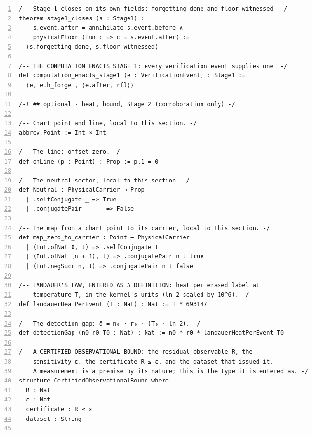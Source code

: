 \documentclass[10pt]{article}
\newcommand{\leansize}{\fontsize{5.5pt}{6.75pt}\selectfont}
\begin{document}
\begin{multicols}{2}
\begin{Verbatim}[numbers=left,firstnumber=1,numbersep=3pt,xleftmargin=2.6em,breaklines=true,breakanywhere=true,breakautoindent=false,breakindent=1.4em,breaksymbolleft={},breakanywheresymbolpre={},fontsize=\leansize]
/-- Stage 1 closes on its own fields: forgetting done and floor witnessed. -/
theorem stage1_closes (s : Stage1) :
    s.event.after = annihilate s.event.before ∧
    physicalFloor (fun c => c = s.event.after) :=
  ⟨s.forgetting_done, s.floor_witnessed⟩

/-- THE COMPUTATION ENACTS STAGE 1: every verification event supplies one. -/
def computation_enacts_stage1 (e : VerificationEvent) : Stage1 :=
  ⟨e, e.h_forget, ⟨e.after, rfl⟩⟩

/-! ## optional · heat, bound, Stage 2 (corroboration only) -/

/-- Chart point and line, local to this section. -/
abbrev Point := Int × Int

/-- The line: offset zero. -/
def onLine (p : Point) : Prop := p.1 = 0

/-- The neutral sector, local to this section. -/
def Neutral : PhysicalCarrier → Prop
  | .selfConjugate _ => True
  | .conjugatePair _ _ _ => False

/-- The map from a chart point to its carrier, local to this section. -/
def map_zero_to_carrier : Point → PhysicalCarrier
  | (Int.ofNat 0, t) => .selfConjugate t
  | (Int.ofNat (n + 1), t) => .conjugatePair n t true
  | (Int.negSucc n, t) => .conjugatePair n t false

/-- LANDAUER'S LAW, ENTERED AS A DEFINITION: heat per erased label at
    temperature T, in the kernel's units (ln 2 scaled by 10^6). -/
def landauerHeatPerEvent (T : Nat) : Nat := T * 693147

/-- The detection gap: δ = n₀ · r₀ · (T₀ · ln 2). -/
def detectionGap (n0 r0 T0 : Nat) : Nat := n0 * r0 * landauerHeatPerEvent T0

/-- A CERTIFIED OBSERVATIONAL BOUND: the residual observable R, the
    sensitivity ε, the certificate R ≤ ε, and the dataset that issued it.
    A measurement is a premise by its nature; this is the type it is entered as. -/
structure CertifiedObservationalBound where
  R : Nat
  ε : Nat
  certificate : R ≤ ε
  dataset : String


\end{Verbatim}
\end{multicols}
\end{document}

